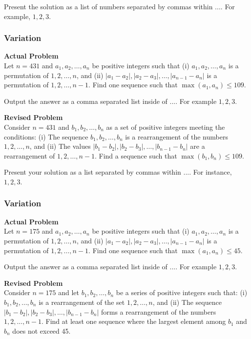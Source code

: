 Present the solution as a list of numbers separated by commas within $\boxed{...}$. For example, $\boxed{1, 2, 3}$.

\subsubsection{Variation}
\textbf{Actual Problem}\\
Let $n = 431$ and $a_1, a_2, \ldots, a_n$ be positive integers such that
(i) $a_1, a_2, \ldots, a_n$ is a permutation of $1, 2, \ldots, n$, and
(ii) $|a_1 - a_2|, |a_2 - a_3|, \ldots, |a_{n-1} - a_{n}|$ is a permutation of $1, 2, \ldots, {n-1}$.
Find one sequence such that $\max(a_1, a_n) \leq 109$.

Output the answer as a comma separated list inside of $\boxed{...}$. For example $\boxed{1, 2, 3}$.

\textbf{Revised Problem}\\
Consider $n = 431$ and $b_1, b_2, \ldots, b_n$ as a set of positive integers meeting the conditions:
(i) The sequence $b_1, b_2, \ldots, b_n$ is a rearrangement of the numbers $1, 2, \ldots, n$, and
(ii) The values $|b_1 - b_2|, |b_2 - b_3|, \ldots, |b_{n-1} - b_n|$ are a rearrangement of $1, 2, \ldots, n-1$.
Find a sequence such that $\max(b_1, b_n) \leq 109$.

Present your solution as a list separated by commas within $\boxed{...}$. For instance, $\boxed{1, 2, 3}$.

\subsubsection{Variation}
\textbf{Actual Problem}\\
Let $n = 175$ and $a_1, a_2, \ldots, a_n$ be positive integers such that
(i) $a_1, a_2, \ldots, a_n$ is a permutation of $1, 2, \ldots, n$, and
(ii) $|a_1 - a_2|, |a_2 - a_3|, \ldots, |a_{n-1} - a_{n}|$ is a permutation of $1, 2, \ldots, {n-1}$.
Find one sequence such that $\max(a_1, a_n) \leq 45$.

Output the answer as a comma separated list inside of $\boxed{...}$. For example $\boxed{1, 2, 3}$.

\textbf{Revised Problem}\\
Consider $n = 175$ and let $b_1, b_2, \ldots, b_n$ be a series of positive integers such that:
(i) $b_1, b_2, \ldots, b_n$ is a rearrangement of the set $1, 2, \ldots, n$, and
(ii) The sequence $|b_1 - b_2|, |b_2 - b_3|, \ldots, |b_{n-1} - b_{n}|$ forms a rearrangement of the numbers $1, 2, \ldots, n-1$.
Find at least one sequence where the largest element among $b_1$ and $b_n$ does not exceed 45.

